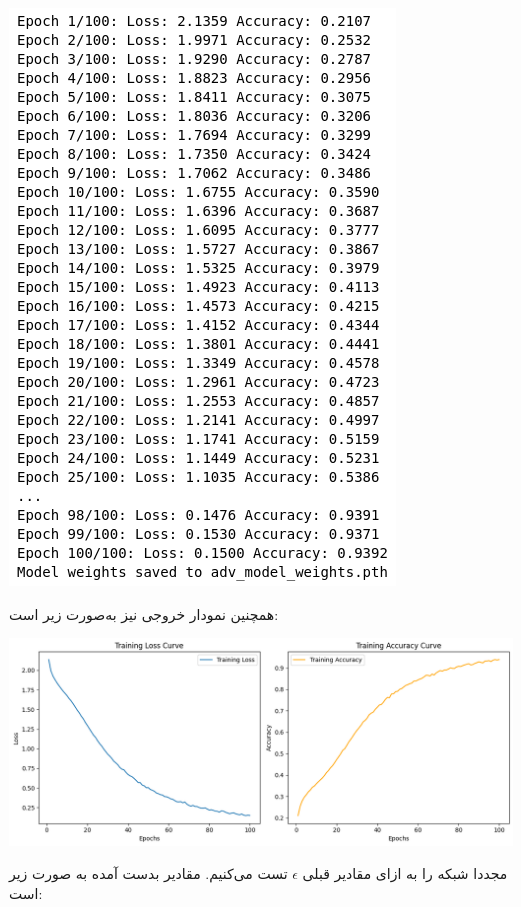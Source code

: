 \begin{qsolve}
	\begin{center}
		\includegraphics*[width=0.5\linewidth]{pics/img12.png}
		\label{روند تغییرات خطا و دقت شبکه در آموزش خصمانه}
	\end{center}
	
	همچنین نمودار خروجی نیز به‌صورت زیر است:
	
	\begin{center}
		\includegraphics*[width=1\linewidth]{pics/img13.png}
		\label{نمودار خطا و دقت شبکه در آموزش خصمانه}
	\end{center}
	
	مجددا شبکه را به ازای مقادیر قبلی $\epsilon$ تست می‌کنیم. مقادیر بدست آمده به صورت زیر است:
\end{qsolve}



